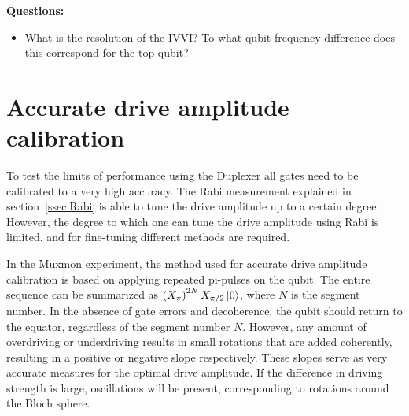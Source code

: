       \textbf{Questions:}
      \begin{itemize}
        \item What is the resolution of the IVVI? To what qubit frequency difference does this correspond for the top qubit?
      \end{itemize}

    \section{Accurate drive amplitude calibration}
      \label{sec:PiX360}
      To test the limits of performance using the Duplexer all gates need to be calibrated to a very high accuracy. The Rabi measurement explained in section~\ref{ssec:Rabi} is able to tune the drive amplitude up to a certain degree. However, the degree to which one can tune the drive amplitude using Rabi is limited, and for fine-tuning different methods are required.

      In the Muxmon experiment, the method used for accurate drive amplitude calibration is based on applying repeated pi-pulses on the qubit. The entire sequence can be summarized as $\left( X_{\pi} \right)^{2N} X_{\pi/2} \ket{0}$, where $N$ is the segment number. In the absence of gate errors and decoherence, the qubit should return to the equator, regardless of the segment number $N$. However, any amount of overdriving or underdriving results in small rotations that are added coherently, resulting in a positive or negative slope respectively. These slopes serve as very accurate measures for the optimal drive amplitude. If the difference in driving strength is large, oscillations will be present, corresponding to rotations around the Bloch sphere.


